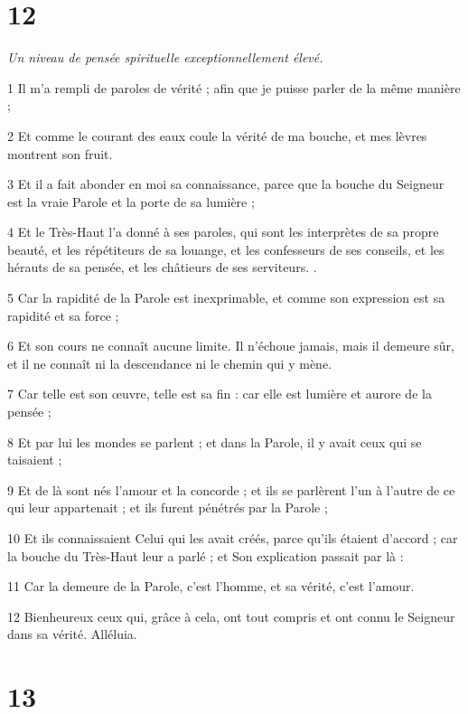 \chapter{12}

\par \textit{Un niveau de pensée spirituelle exceptionnellement élevé.}

\par 1 Il m'a rempli de paroles de vérité ; afin que je puisse parler de la même manière ;
\par 2 Et comme le courant des eaux coule la vérité de ma bouche, et mes lèvres montrent son fruit.
\par 3 Et il a fait abonder en moi sa connaissance, parce que la bouche du Seigneur est la vraie Parole et la porte de sa lumière ;
\par 4 Et le Très-Haut l'a donné à ses paroles, qui sont les interprètes de sa propre beauté, et les répétiteurs de sa louange, et les confesseurs de ses conseils, et les hérauts de sa pensée, et les châtieurs de ses serviteurs. .
\par 5 Car la rapidité de la Parole est inexprimable, et comme son expression est sa rapidité et sa force ;
\par 6 Et son cours ne connaît aucune limite. Il n’échoue jamais, mais il demeure sûr, et il ne connaît ni la descendance ni le chemin qui y mène.
\par 7 Car telle est son œuvre, telle est sa fin : car elle est lumière et aurore de la pensée ;
\par 8 Et par lui les mondes se parlent ; et dans la Parole, il y avait ceux qui se taisaient ;
\par 9 Et de là sont nés l'amour et la concorde ; et ils se parlèrent l'un à l'autre de ce qui leur appartenait ; et ils furent pénétrés par la Parole ;
\par 10 Et ils connaissaient Celui qui les avait créés, parce qu'ils étaient d'accord ; car la bouche du Très-Haut leur a parlé ; et Son explication passait par là :
\par 11 Car la demeure de la Parole, c'est l'homme, et sa vérité, c'est l'amour.
\par 12 Bienheureux ceux qui, grâce à cela, ont tout compris et ont connu le Seigneur dans sa vérité. Alléluia.

\chapter{13}

